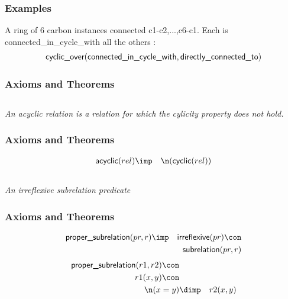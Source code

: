 \subsubsection{Examples}
\begin{clist}
\item A ring of 6 carbon instances connected c1-c2,...,c6-c1. Each is connected\_in\_cycle\_with all the others : \begin{eqnarray*}
 \mbox{\sf cyclic\_over}( \mbox{\sf connected\_in\_cycle\_with},  \mbox{\sf directly\_connected\_to}) 
\end{eqnarray*}

\end{clist}

\subsubsection{Axioms and Theorems}



\subsection{ }
\emph{An acyclic relation is a relation for which the cylicity property does not hold.}

\subsubsection{Axioms and Theorems}


\begin{eqnarray*}
 \pr{acyclic}(rel) &\imp & \n( \pr{cyclic}(rel) )
\end{eqnarray*}

\subsection{ }
\emph{An irreflexive subrelation predicate}

\subsubsection{Axioms and Theorems}


\begin{eqnarray*}
 \pr{proper\_subrelation}(pr, r) &\imp & \pr{irreflexive}(pr) \con \\
&& \pr{subrelation}(pr, r) 
\end{eqnarray*}
\begin{eqnarray*}
 \pr{proper\_subrelation}(r1, r2) \con \\
r1(x, y) \con \\
 \n(x = y)&\dimp &r2(x, y) 
\end{eqnarray*}

